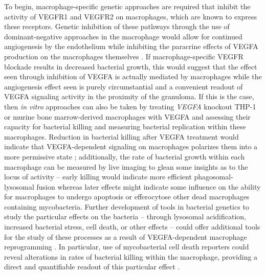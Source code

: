 To begin, macrophage\hyp{}specific genetic approaches are required that inhibit the activity of VEGFR1 and VEGFR2 on macrophages, which are known to express these receptors. Genetic inhibition of these pathways through the use of dominant-negative approaches in the macrophage would allow for continued angiogenesis by the endothelium while inhibiting the paracrine effects of VEGFA production on the macrophages themselves \citep{Tsou2002, Stratmann2001}. If macrophage\hyp{}specific VEGFR blockade results in decreased bacterial growth, this would suggest that the effect seen through inhibition of VEGFA is actually mediated by macrophages while the angiogenesis effect seen is purely circumstantial and a convenient readout of VEGFA signaling activity in the proximity of the granuloma. If this is the case, then \textit{in vitro} approaches can also be taken by treating \textit{VEGFA} knockout THP\hyp{}1 or murine bone marrow-derived macrophages with VEGFA and assessing their capacity for bacterial killing and measuring bacterial replication within these macrophages. Reduction in bacterial killing after VEGFA treatment would indicate that VEGFA\hyp{}dependent signaling on macrophages polarizes them into a more permissive state \citep{Murakami2006, Murakami2008, Dineen2008, Lai2019, Okikawa2022}; additionally, the rate of bacterial growth within each macrophage can be measured by live imaging to glean some insights as to the locus of activity -- early killing would indicate more efficient phagosomal\hyp{}lysosomal fusion whereas later effects might indicate some influence on the ability for macrophages to undergo apoptosis or efferocytose other dead macrophages containing mycobacteria. Further development of tools in bacterial genetics to study the particular effects on the bacteria -- through lysosomal acidification, increased bacterial stress, cell death, or other effects -- could offer additional tools for the study of these processes as a result of VEGFA-dependent macrophage reprogramming \citep{Abramovitch2011, Abramovitch2018, Carroll2010, Hayashi2018, McCann2007, Simeone2012, Sukumar2014, Tan2013}. In particular, use of mycobacterial cell death reporters could reveal alterations in rates of bacterial killing within the macrophage, providing a direct and quantifiable readout of this particular effect \citep{MacGilvary2018, Nkwouano2017}. 

